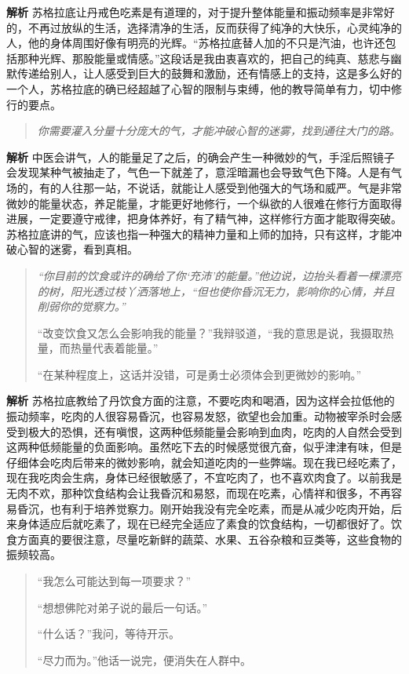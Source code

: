 \textbf{解析} 苏格拉底让丹戒色吃素是有道理的，对于提升整体能量和振动频率是非常好的，不再过放纵的生活，选择清净的生活，反而获得了纯净的大快乐，心灵纯净的人，他的身体周围好像有明亮的光辉。“苏格拉底替人加的不只是汽油，也许还包括那种光辉、那股能量或情感。”这段话是我由衷喜欢的，把自己的纯真、慈悲与幽默传递给别人，让人感受到巨大的鼓舞和激励，还有情感上的支持，这是多么好的一个人，苏格拉底的确已经超越了心智的限制与束缚，他的教导简单有力，切中修行的要点。

\begin{quote}\it
    你需要灌入分量十分庞大的气，才能冲破心智的迷雾，找到通往大门的路。
\end{quote}

\textbf{解析} 中医会讲气，人的能量足了之后，的确会产生一种微妙的气，手淫后照镜子会发现某种气被抽走了，气色一下就差了，意淫暗漏也会导致气色下降。人是有气场的，有的人往那一站，不说话，就能让人感受到他强大的气场和威严。气是非常微妙的能量状态，养足能量，才能更好地修行，一个纵欲的人很难在修行方面取得进展，一定要遵守戒律，把身体养好，有了精气神，这样修行方面才能取得突破。苏格拉底讲的气，应该也指一种强大的精神力量和上师的加持，只有这样，才能冲破心智的迷雾，看到真相。

\begin{quotation}\it
    “你目前的饮食或许的确给了你‘充沛’的能量。”他边说，边抬头看着一棵漂亮的树，阳光透过枝丫洒落地上，“但也使你昏沉无力，影响你的心情，并且削弱你的觉察力。”

    “改变饮食又怎么会影响我的能量？”我辩驳道，“我的意思是说，我摄取热量，而热量代表着能量。”

    “在某种程度上，这话并没错，可是勇士必须体会到更微妙的影响。”
\end{quotation}

\textbf{解析} 苏格拉底教给了丹饮食方面的注意，不要吃肉和喝酒，因为这样会拉低他的振动频率，吃肉的人很容易昏沉，也容易发怒，欲望也会加重。动物被宰杀时会感受到极大的恐惧，还有嗔恨，这两种低频能量会影响到血肉，吃肉的人自然会受到这两种低频能量的负面影响。虽然吃下去的时候感觉很亢奋，似乎津津有味，但是仔细体会吃肉后带来的微妙影响，就会知道吃肉的一些弊端。现在我已经吃素了，现在我吃肉会生病，身体已经很敏感了，不宜吃肉了，也不喜欢肉食了。以前我是无肉不欢，那种饮食结构会让我昏沉和易怒，而现在吃素，心情祥和很多，不再容易昏沉，也有利于培养觉察力。刚开始我没有完全吃素，而是从减少吃肉开始，后来身体适应后就吃素了，现在已经完全适应了素食的饮食结构，一切都很好了。饮食方面真的要很注意，尽量吃新鲜的蔬菜、水果、五谷杂粮和豆类等，这些食物的振频较高。

\begin{quotation}
    “我怎么可能达到每一项要求？”

    “想想佛陀对弟子说的最后一句话。”

    “什么话？”我问，等待开示。

    “尽力而为。”他话一说完，便消失在人群中。
\end{quotation}

